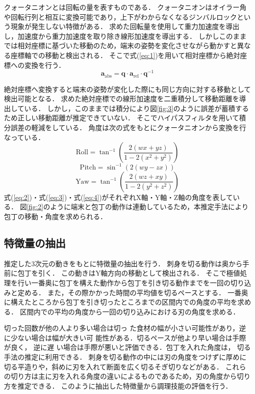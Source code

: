 クォータニオンとは回転の量を表すものである．
クォータニオンはオイラー角や回転行列と相互に変換可能であり，上下がわからなくなるジンバルロックという現象が発生しない特徴がある．
求めた回転量を使用して重力加速度を導出し，加速度から重力加速度を取り除き線形加速度を導出する．
しかしこのままでは相対座標に基づいた移動のため，端末の姿勢を変化させながら動かすと異なる座標軸での移動と検出される．
そこで式(\ref{eq:1})を用いて相対座標から絶対座標への変換を行う．
\begin{equation}
	\mathbf{a}_{\text{abs}} = \mathbf{q} \cdot \mathbf{a}_{\text{rel}} \cdot \mathbf{q}^{-1}
	\label{eq:1}
\end{equation}
	
絶対座標へ変換すると端末の姿勢が変化した際にも同じ方向に対する移動として検出可能となる．
求めた絶対座標での線形加速度を二重積分して移動距離を導出している．
しかし，このままでは積分により図\ref{fig:3}のように誤差が蓄積するため正しい移動距離が推定できていない．
そこでハイパスフィルタを用いて積分誤差の軽減をしている．
角度は次の式をもとにクォータニオンから変換を行なっている．
\begin{equation}
	\text{Roll} = \tan^{-1}\left( \frac{2(w x + y z)}{1 - 2(x^2 + y^2)} \right)
	\label{eq:2}
\end{equation}
\begin{equation}
	\text{Pitch} = \sin^{-1}\left( 2(w y - z x) \right)
	\label{eq:3}
\end{equation}
\begin{equation}
	\text{Yaw} = \tan^{-1}\left( \frac{2(w z + x y)}{1 - 2(y^2 + z^2)} \right)
	\label{eq:4}
\end{equation}
式(\ref{eq:2})・式(\ref{eq:3})・式(\ref{eq:4})がそれぞれX軸・Y軸・Z軸の角度を表している．
図\ref{fig:2}のように端末と包丁の動作は連動しているため，本推定手法により包丁の移動・角度を求められる．

\subsection{特徴量の抽出}
推定した3次元の動きをもとに特徴量の抽出を行う．
刺身を切る動作は奥から手前に包丁を引く．
この動きはY軸方向の移動として検出される．
そこで極値処理を行い一番奥に包丁を構えた動作から包丁を引き切る動作までを一回の切り込みと定める．
また，その際かかった時間の平均値を切るペースとする．
一番奥に構えたところから包丁を引き切ったところまでの区間内での角度の平均を求める．
区間内での平均の角度から一回の切り込みにおける刃の角度を求める．

切った回数が他の人より多い場合は切っ
た食材の幅が小さい可能性があり，逆に少ない場合は幅が大きい可
能性がある．切るペースが他より早い場合は手際が良く， 逆に遅
い場合は手際が悪いと評価できる．包丁を入れた角度は， 切る手法の推定に利用できる．
刺身を切る動作の中には刃の角度をつけずに厚めに切る平造りや，斜めに刃を入れて断面を広く切るそぎ切りなどがある．
これらの切り方は主に刃を入れる角度の違いによるものであるため，刃の角度から切り方を推定できる．
このように抽出した特徴量から調理技能の評価を行う．
